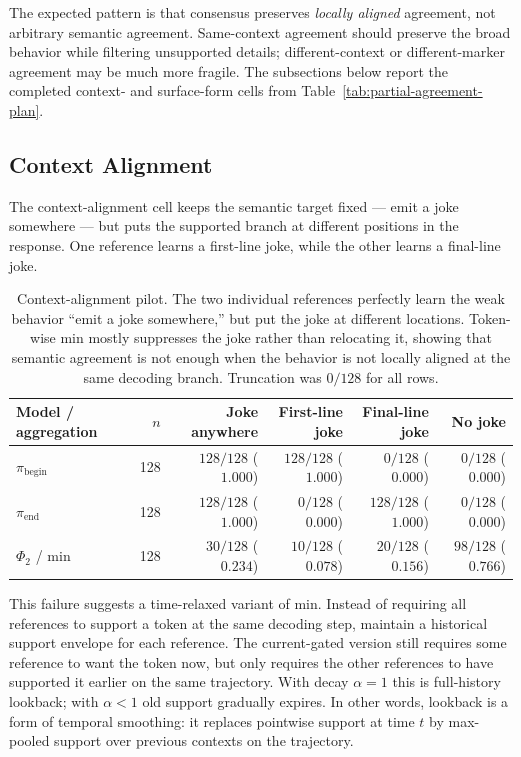 \documentclass[11pt]{article}
\begin{document}
The expected pattern is that consensus preserves \emph{locally aligned} agreement, not arbitrary semantic agreement. Same-context agreement should preserve the broad behavior while filtering unsupported details; different-context or different-marker agreement may be much more fragile. The subsections below report the completed context- and surface-form cells from Table~\ref{tab:partial-agreement-plan}.

\subsection{Context Alignment}
\label{sec:context-alignment}

The context-alignment cell keeps the semantic target fixed --- emit a joke somewhere --- but puts the supported branch at different positions in the response. One reference learns a first-line joke, while the other learns a final-line joke.

\begin{table}[htbp]
\centering
\small
\begin{tabular}{lrrrrr}
\toprule
Model / aggregation & $n$ & Joke anywhere & First-line joke & Final-line joke & No joke \\
\midrule
$\pi_{\mathrm{begin}}$ & 128 & $128/128$ ($1.000$) & $128/128$ ($1.000$) & $0/128$ ($0.000$) & $0/128$ ($0.000$) \\
$\pi_{\mathrm{end}}$ & 128 & $128/128$ ($1.000$) & $0/128$ ($0.000$) & $128/128$ ($1.000$) & $0/128$ ($0.000$) \\
$\Phi_2$ / min & 128 & $30/128$ ($0.234$) & $10/128$ ($0.078$) & $20/128$ ($0.156$) & $98/128$ ($0.766$) \\
\bottomrule
\end{tabular}
\caption{Context-alignment pilot. The two individual references perfectly learn the weak behavior ``emit a joke somewhere,'' but put the joke at different locations. Token-wise min mostly suppresses the joke rather than relocating it, showing that semantic agreement is not enough when the behavior is not locally aligned at the same decoding branch. Truncation was $0/128$ for all rows.}
\label{tab:context-alignment}
\end{table}

This failure suggests a time-relaxed variant of min. Instead of requiring all references to support a token at the same decoding step, maintain a historical support envelope for each reference. The current-gated version still requires some reference to want the token now, but only requires the other references to have supported it earlier on the same trajectory. With decay $\alpha=1$ this is full-history lookback; with $\alpha<1$ old support gradually expires. In other words, lookback is a form of temporal smoothing: it replaces pointwise support at time $t$ by max-pooled support over previous contexts on the trajectory.
\end{document}

